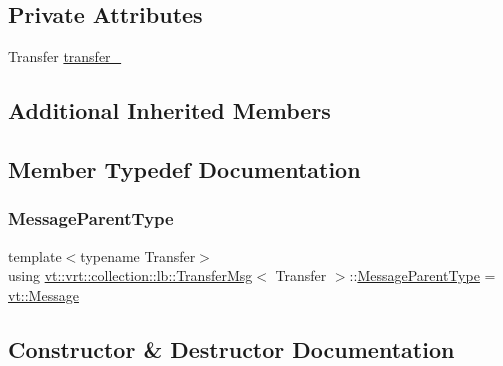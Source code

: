\subsection*{Private Attributes}
\begin{DoxyCompactItemize}
\item 
Transfer \hyperlink{structvt_1_1vrt_1_1collection_1_1lb_1_1_transfer_msg_ab8a2aefc116dd5d0fc06e6aa722ce0ef}{transfer\+\_\+}
\end{DoxyCompactItemize}
\subsection*{Additional Inherited Members}


\subsection{Member Typedef Documentation}
\mbox{\label{structvt_1_1vrt_1_1collection_1_1lb_1_1_transfer_msg_a7bbde6f5de84e4616188963323d473ca}} 
\subsubsection{\texorpdfstring{Message\+Parent\+Type}{MessageParentType}}
{\footnotesize\ttfamily template$<$typename Transfer$>$ \\
using \hyperlink{structvt_1_1vrt_1_1collection_1_1lb_1_1_transfer_msg}{vt\+::vrt\+::collection\+::lb\+::\+Transfer\+Msg}$<$ Transfer $>$\+::\hyperlink{structvt_1_1messaging_1_1_active_msg_ac2e6d93267991027ce78c968b17064c7}{Message\+Parent\+Type} =  \hyperlink{namespacevt_a3a3ddfef40b4c90915fa43cdd5f129ea}{vt\+::\+Message}}



\subsection{Constructor \& Destructor Documentation}
\mbox{\label{structvt_1_1vrt_1_1collection_1_1lb_1_1_transfer_msg_ad94fef4d81e901de07019aa41718c516}} 
